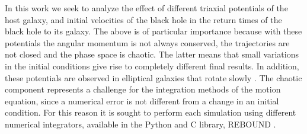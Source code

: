 	In this work we seek to analyze the effect of different triaxial potentials of the host galaxy, and initial velocities of the black hole in the return times of the black hole to its galaxy. The above is of particular importance because with these potentials the angular momentum is not always conserved, the trajectories are not closed and the phase space is chaotic. The latter means that small variations in the initial conditions give rise to completely different final results. In addition, these potentials are observed in elliptical galaxies that rotate slowly \cite{buote2002chandra, binney1978elliptical}. The chaotic component represents a challenge for the integration methods of the motion equation, since a numerical error is not different from a change in an initial condition. For this reason it is sought to perform each simulation using different numerical integrators, available in the Python and C library, REBOUND \cite{larson2017modeling}.
	
%	

